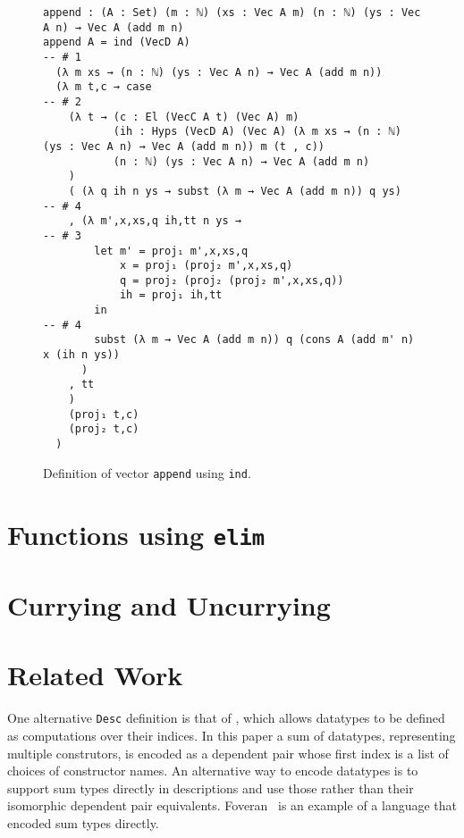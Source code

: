 \documentclass[preprint,nonatbib]{sigplanconf}
\begin{document}
\begin{figure*}
\caption{Definition of vector {\tt append} using {\tt ind}.}
\label{fig:ind:append}

\begin{verbatim}
append : (A : Set) (m : ℕ) (xs : Vec A m) (n : ℕ) (ys : Vec A n) → Vec A (add m n) 
append A = ind (VecD A)                                         -- # 1
  (λ m xs → (n : ℕ) (ys : Vec A n) → Vec A (add m n)) 
  (λ m t,c → case                                               -- # 2
    (λ t → (c : El (VecC A t) (Vec A) m)
           (ih : Hyps (VecD A) (Vec A) (λ m xs → (n : ℕ) (ys : Vec A n) → Vec A (add m n)) m (t , c))
           (n : ℕ) (ys : Vec A n) → Vec A (add m n)
    )
    ( (λ q ih n ys → subst (λ m → Vec A (add m n)) q ys)       -- # 4
    , (λ m',x,xs,q ih,tt n ys →                                -- # 3
        let m' = proj₁ m',x,xs,q
            x = proj₁ (proj₂ m',x,xs,q)
            q = proj₂ (proj₂ (proj₂ m',x,xs,q))
            ih = proj₁ ih,tt
        in                                                      -- # 4
        subst (λ m → Vec A (add m n)) q (cons A (add m' n) x (ih n ys))
      )
    , tt
    )
    (proj₁ t,c)
    (proj₂ t,c)
  )
\end{verbatim}

\end{figure*}

\section{Functions using {\tt elim}}
\label{sec:elim}

\section{Currying and Uncurrying}
\label{sec:curry}


\section{Related Work}
\label{sec:related-work}

One alternative {\tt Desc} definition is that of \citet{dagand:phd}, which
allows datatypes to be defined as computations over their indices.
In this paper a sum of datatypes, representing multiple construtors,
is encoded as a dependent pair whose first index is a list of choices
of constructor names. An alternative way to encode datatypes is to
support sum types directly in descriptions and use those rather than
their isomorphic dependent pair equivalents. Foveran~\citep{foveran} is
an example of a language that encoded sum types directly.


\clearpage

\acks




\end{document}
